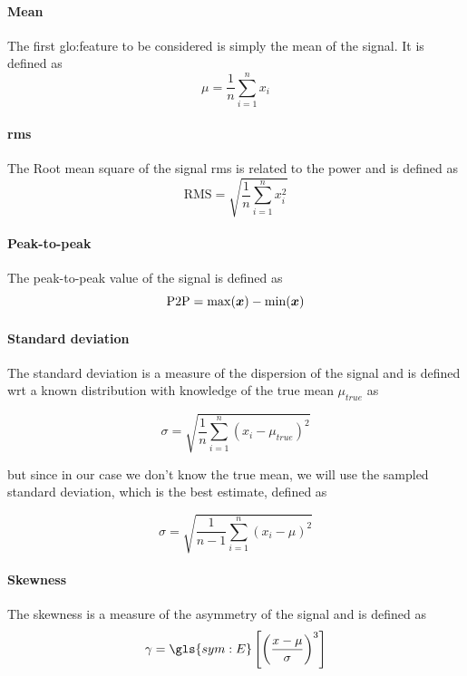 \paragraph{Mean}
The first \gls{glo:feature} to be considered is simply the mean of the signal. It is defined as
\begin{equation}
    \mu = \frac{1}{n}\sum_{i=1}^n x_i
\end{equation}

\paragraph{\gls{rms}}
The Root mean square of the signal \gls{rms} is related to the power and is defined as
\begin{equation}
    \text{RMS} = \sqrt{\frac{1}{n}\sum_{i=1}^n x_i^2}
\end{equation}

\paragraph{Peak-to-peak}
The peak-to-peak value of the signal is defined as
\begin{equation}
    \text{P2P} = \max(\bm{x}) - \min(\bm{x})
\end{equation}

\paragraph{Standard deviation}
The standard deviation is a measure of the dispersion of the signal and is defined {\gls{wrt}} a known distribution with knowledge of the true mean $\mu_{true}$ as

\begin{equation}
    {\sigma} = \sqrt{\frac{1}{n}\sum_{i=1}^n (x_i - \mu_{true})^2}
\end{equation}

but since in our case we don't know the true mean, we will use the sampled standard deviation, which is the best estimate, defined as

\begin{equation}
    \hat{\sigma} = \sqrt{\frac{1}{n-1}\sum_{i=1}^n (x_i - \mu)^2}
\end{equation}

\paragraph{Skewness}
The skewness is a measure of the asymmetry of the signal and is defined as
\begin{equation}
    \gamma = \gls{sym:E}\left[ \left(\frac{x - \mu}{\sigma}\right)^3 \right]
\end{equation}

